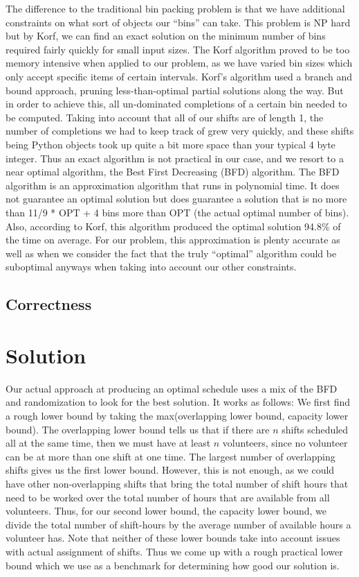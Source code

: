 \documentclass[11pt]{article}
\theoremstyle{definition}
\begin{document}
\begin{multicols}{2}
The difference to the traditional bin packing problem is that we have additional constraints on what sort of objects our ``bins'' can take.
This problem is NP hard but by Korf, we can find an exact solution on the minimum number of bins required fairly quickly for small input sizes. 
The Korf algorithm proved to be too memory intensive when applied to our problem, as we have varied bin sizes which only accept specific items of certain intervals. 
Korf's algorithm used a branch and bound approach, pruning less-than-optimal partial solutions along the way. But in order to achieve this, all un-dominated completions of a certain 
bin needed to be computed. Taking into account that all of our shifts are of length 1, the number of completions we had to keep track of grew very quickly, and these shifts being Python objects 
took up quite a bit more space than your typical 4 byte integer. 
Thus an exact algorithm is not practical in our case, and we resort to a near optimal algorithm, the Best First Decreasing (BFD) algorithm.
The BFD algorithm is an approximation algorithm that runs in polynomial time. It does not guarantee an optimal solution but does guarantee a solution that is 
no more than 11/9 * OPT + 4 bins more than OPT (the actual optimal number of bins). Also, according to Korf, this algorithm produced the optimal solution 94.8\% of the time on average. 
For our problem, this approximation is plenty accurate as well as when we consider the fact that the truly ``optimal'' algorithm could be suboptimal anyways when taking into account our other constraints.


\subsection{Correctness}


\section{Solution}

Our actual approach at producing an optimal schedule uses a mix of the BFD and randomization to look for the best solution.
It works as follows:
We first find a rough lower bound by taking the max(overlapping lower bound, capacity lower bound). The overlapping lower bound tells us that if there are $n$ shifts scheduled all at the same time, then 
we must have at least $n$ volunteers, since no volunteer can be at more than one shift at one time. The largest number of overlapping shifts gives us the first lower bound. However, this is not enough, as 
we could have other non-overlapping shifts that bring the total number of shift hours that need to be worked over the total number of hours that are available from all volunteers. Thus, for our second lower bound,
the capacity lower bound, we divide the total number of shift-hours by the average number of available hours a volunteer has. Note that neither of these lower bounds take into account issues with actual assignment 
of shifts. Thus we come up with a rough practical lower bound which we use as a benchmark for determining how good our solution is. 


\end{multicols}
\end{document}
